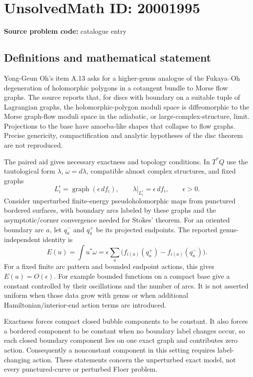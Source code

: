 \documentclass[11pt]{article}
\begin{document}
\section*{UnsolvedMath ID: 20001995}
\textbf{Source problem code:} catalogue entry
\subsection{Definitions and mathematical statement}
Yong-Geun Oh's item A.13 asks for a higher-genus analogue of the Fukaya--Oh degeneration of holomorphic polygons in a cotangent bundle to Morse flow graphs. The source reports that, for discs with boundary on a suitable tuple of Lagrangian graphs, the holomorphic-polygon moduli space is diffeomorphic to the Morse graph-flow moduli space in the adiabatic, or large-complex-structure, limit. Projections to the base have amoeba-like shapes that collapse to flow graphs. Precise genericity, compactification and analytic hypotheses of the disc theorem are not reproduced.

The paired aid gives necessary exactness and topology conditions. In \(T^*Q\) use the tautological form \(\lambda\), \(\omega=d\lambda\), compatible almost complex structures, and fixed graphs
\[
 L_i^\epsilon=\operatorname{graph}(\epsilon\,df_i),\qquad
 \lambda|_{L_i^\epsilon}=\epsilon\,df_i,\qquad\epsilon>0.
\]
Consider unperturbed finite-energy pseudoholomorphic maps from punctured bordered surfaces, with boundary arcs labeled by these graphs and the asymptotic/corner convergence needed for Stokes' theorem. For an oriented boundary arc \(a\), let \(q_a^-\) and \(q_a^+\) be its projected endpoints. The reported genus-independent identity is
\[
 E(u)=\int u^*\omega
 =\epsilon\sum_a\bigl(f_{i(a)}(q_a^+)-f_{i(a)}(q_a^-)\bigr).
\]
For a fixed finite arc pattern and bounded endpoint actions, this gives \(E(u)=O(\epsilon)\). For example bounded functions on a compact base give a constant controlled by their oscillations and the number of arcs. It is not asserted uniform when those data grow with genus or when additional Hamiltonian/interior-end action terms are introduced.

Exactness forces compact closed bubble components to be constant. It also forces a bordered component to be constant when no boundary label changes occur, so each closed boundary component lies on one exact graph and contributes zero action. Consequently a nonconstant component in this setting requires label-changing action. These statements concern the unperturbed exact model, not every punctured-curve or perturbed Floer problem.
\end{document}
